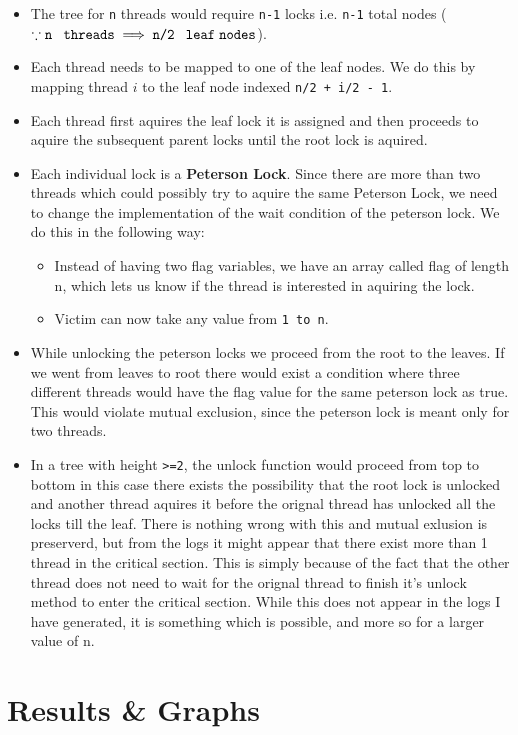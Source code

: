 \documentclass[a4paper,12pt]{report}
\begin{document}
\begin{itemize}
\item The tree for \texttt{n} threads would require \texttt{n-1} locks i.e. \texttt{n-1} total nodes ($\because \texttt{n \;threads} \implies \texttt{n/2\; leaf\;nodes}$).
\item Each thread needs to be mapped to one of the leaf nodes. We do this by mapping thread $i$ to the leaf node indexed \texttt{n/2 + i/2 - 1}.
\item Each thread first aquires the leaf lock it is assigned and then proceeds to aquire the subsequent parent locks until the root lock is aquired.
\item Each individual lock is a \textbf{Peterson Lock}. Since there are more than two threads which could possibly try to aquire the same Peterson Lock, we need to change the implementation of the wait condition of the peterson lock. We do this in the following way:
\begin{itemize}
\item Instead of having two flag variables, we have an array called flag of length n, which lets us know if the thread is interested in aquiring the lock.
\item Victim can now take any value from \texttt{1 to n}.
\end{itemize}
\item While unlocking the peterson locks we proceed from the root to the leaves. If we went from leaves to root there would exist a condition where three different threads would have the flag value for the same peterson lock as true. This would violate mutual exclusion, since the peterson lock is meant only for two threads.
\item In a tree with height \texttt{>=2}, the unlock function would proceed from top to bottom in this case there exists the possibility that the root lock is unlocked and another thread aquires it before the orignal thread has unlocked all the locks till the leaf. There is nothing wrong with this and mutual exlusion is preserverd, but from the logs it might appear that there exist more than 1 thread in the critical section. This is simply because of the fact that the other thread does not need to wait for the orignal thread to finish it's unlock method to enter the critical section. While this does not appear in the logs I have generated, it is something which is possible, and more so for a larger value of n.
\end{itemize}
\newpage
\section{Results \& Graphs}
\end{document}
